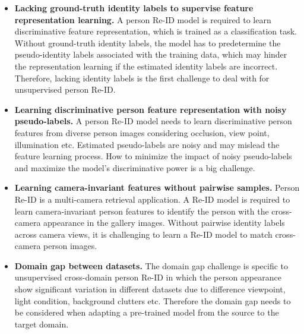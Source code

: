 \documentclass[a4paper,fleqn]{cas-dc}
\begin{document}
\begin{itemize}
\item {\bf Lacking ground-truth identity labels to supervise feature representation learning.} A person Re-ID model is required to learn discriminative feature representation, which is trained as a classification task. Without ground-truth identity labels, the model has to predetermine the pseudo-identity labels associated with the training data, which may hinder the representation learning if the estimated identity labels are incorrect. Therefore, lacking identity labels is the first challenge to deal with for unsupervised person Re-ID.
\item {\bf Learning discriminative person feature representation with noisy pseudo-labels.} A person Re-ID model needs to learn discriminative person features from diverse person images considering occlusion, view point, illumination etc. Estimated pseudo-labels are noisy and may mislead the feature learning process. How to minimize the impact of noisy pseudo-labels and maximize the model's discriminative power is a big challenge.
\item {\bf Learning camera-invariant features without pairwise samples.} Person Re-ID is a multi-camera retrieval application. A Re-ID model is required to learn camera-invariant person features to identify the person with the cross-camera appearance in the gallery images. Without pairwise identity labels across camera views, it is challenging to learn a Re-ID model to match cross-camera person images.
\item {\bf Domain gap between datasets.} The domain gap challenge is specific to unsupervised cross-domain person Re-ID in which the person appearance show significant variation in different datasets due to difference viewpoint, light condition, background clutters etc. Therefore the domain gap needs to be considered when adapting a pre-trained model from the source to the target domain.
\end{itemize}
\end{document}
